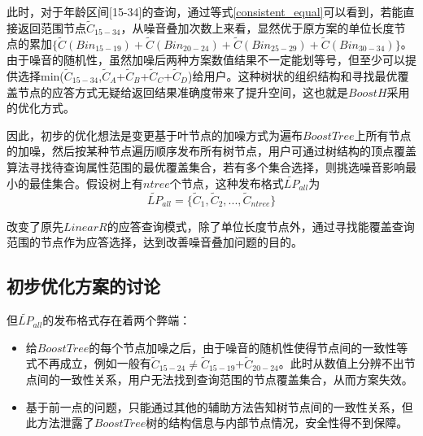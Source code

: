此时，对于年龄区间[15-34]的查询，通过等式\ref{consistent_equal}可以看到，若能直接返回范围节点{$\widetilde{C}_{15-34}$}，从噪音叠加次数上来看，显然优于原方案的单位长度节点的累加$\{\tilde{C}(Bin_{15-19})+\tilde{C}(Bin_{20-24})+\tilde{C}(Bin_{25-29})+\tilde{C}(Bin_{30-34})\}$。由于噪音的随机性，虽然加噪后两种方案数值结果不一定能划等号，但至少可以提供选择min({$\tilde{C}_{15-34}$},{$\tilde{C}_{A}$}+{$\tilde{C}_{B}$}+{$\tilde{C}_{C}$}+{$\tilde{C}_{D}$})给用户。这种树状的组织结构和寻找最优覆盖节点的应答方式无疑给返回结果准确度带来了提升空间，这也就是$BoostH$采用的优化方式。

因此，初步的优化想法是变更基于叶节点的加噪方式为遍布$BoostTree$上所有节点的加噪，然后按某种节点遍历顺序发布所有树节点，用户可通过树结构的顶点覆盖算法寻找待查询属性范围的最优覆盖集合，若有多个集合选择，则挑选噪音影响最小的最佳集合。假设树上有$ntree$个节点，这种发布格式$\widetilde{LP}_{all}$为
\begin{equation}
\label{L_allnodes}
\widetilde{LP}_{all} = \{\tilde{C}_{1},\tilde{C}_{2},...,\tilde{C}_{ntree}\}
\end{equation}

改变了原先$LinearR$的应答查询模式，除了单位长度节点外，通过寻找能覆盖查询范围的节点作为应答选择，达到改善噪音叠加问题的目的。

\subsection{初步优化方案的讨论}
\label{BoostH}

但$\widetilde{LP}_{all}$的发布格式存在着两个弊端：
\begin{itemize}
	\item 给$BoostTree$的每个节点加噪之后，由于噪音的随机性使得节点间的一致性等式不再成立，例如一般有{$\tilde{C}_{15-24}$}$ \neq ${$\tilde{C}_{15-19}$}+{$\tilde{C}_{20-24}$}。此时从数值上分辨不出节点间的一致性关系，用户无法找到查询范围的节点覆盖集合，从而方案失效。
	\item 基于前一点的问题，只能通过其他的辅助方法告知树节点间的一致性关系，但此方法泄露了$BoostTree$树的结构信息与内部节点情况，安全性得不到保障。
\end{itemize}

